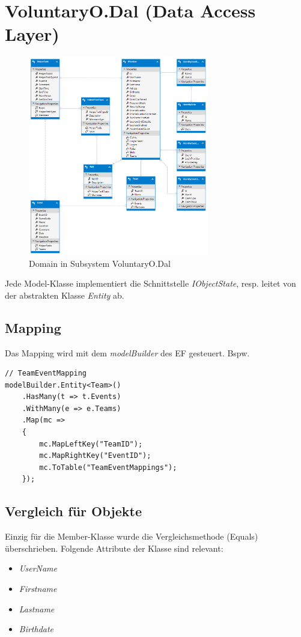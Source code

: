 \section{VoluntaryO.Dal (Data Access Layer)}
    \begin{figure}[h]
  		\vspace{-5pt}
    	\centering
    	\includegraphics[width=0.7\textwidth]{content/architekturdokumentation/images/edmx.png}
  		\vspace{-20pt}
    	\caption{Domain in Subsystem VoluntaryO.Dal}
	\end{figure}
	Jede Model-Klasse implementiert die Schnittstelle \textit{IObjectState}, resp. leitet von der abstrakten Klasse \textit{Entity} ab.

	\subsection{Mapping}
	Das Mapping wird mit dem \textit{modelBuilder} des EF gesteuert. Bspw.
	\begin{lstlisting}[language=CSharp, caption=Mapping in VoluntaryoContext.cs, label=lst:mappingcontextcs, firstnumber=1]
// TeamEventMapping
modelBuilder.Entity<Team>()
    .HasMany(t => t.Events)
    .WithMany(e => e.Teams)
    .Map(mc =>
    {
        mc.MapLeftKey("TeamID");
        mc.MapRightKey("EventID");
        mc.ToTable("TeamEventMappings");
    });
    \end{lstlisting}

	\subsection{Vergleich für Objekte}
	Einzig für die Member-Klasse wurde die Vergleichsmethode (Equals) überschrieben. Folgende Attribute der Klasse sind relevant:
	\\\begin{itemize}
		\item \textit{UserName}
		\item \textit{Firstname}
		\item \textit{Lastname}
		\item \textit{Birthdate}
	\end{itemize}

